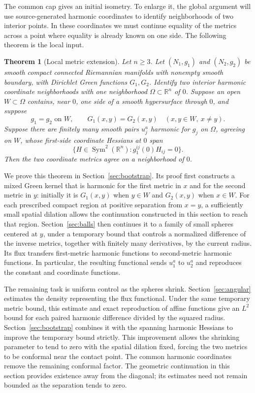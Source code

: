 \documentclass[11pt]{article}
\newtheorem{theorem}{Theorem}[section]
\theoremstyle{definition}
\theoremstyle{remark}
\numberwithin{equation}{section}
\begin{document}
The common cap gives an initial isometry. To enlarge it, the global
argument will use source-generated harmonic coordinates to identify
neighborhoods of two interior points. In these coordinates we must
continue equality of the metrics across a point where equality is
already known on one side. The following theorem is the local input.

\begin{theorem}[Local metric extension]\label{local:extension}
Let $n\geq3$.  Let $(N_1,g_1)$ and $(N_2,g_2)$ be smooth compact
connected Riemannian manifolds with nonempty smooth boundary, with
Dirichlet Green functions $G_1,G_2$.  Identify two interior harmonic
coordinate neighborhoods with one neighborhood $\Omega\subset
\mathbb R^n$ of $0$.  Suppose an open $W\subset\Omega$ contains, near
$0$, one side of a smooth hypersurface through $0$, and suppose
\[
 g_1=g_2\text{ on }W,\qquad
 G_1(x,y)=G_2(x,y)\quad(x,y\in W,\ x\ne y).
\]
Suppose there are finitely many smooth pairs $u_j^a$ harmonic for
$g_j$ on $\Omega$, agreeing on $W$, whose first-side coordinate
Hessians at $0$ span
\[
 \{H\in\operatorname{Sym}^2(\mathbb R^n):g_1^{ij}(0)H_{ij}=0\}.
\]
Then the two coordinate metrics agree on a neighborhood of $0$.
\end{theorem}

We prove this theorem in Section~\ref{sec:bootstrap}. Its proof first
constructs a mixed Green kernel that is harmonic for the first metric in
$x$ and for the second metric in $y$: initially it is $G_1(x,y)$
when $y\in W$ and $G_2(x,y)$ when $x\in W$. For each prescribed
compact region at positive separation from $x=y$, a sufficiently small
spatial dilation allows the continuation constructed in this section to
reach that region. Section~\ref{sec:balls} then continues it to a family
of small spheres centered at $y$, under a temporary bound that controls
a normalized difference of the inverse metrics, together with finitely
many derivatives, by the current radius. Its flux transfers
first-metric harmonic functions to second-metric harmonic functions.
In particular, the resulting functional sends $u_1^a$ to $u_2^a$ and
reproduces the constant and coordinate functions.

The remaining task is uniform control as the spheres shrink.
Section~\ref{sec:angular} estimates the density representing the flux
functional. Under the same temporary metric bound, this estimate and exact
reproduction of affine functions give an $L^2$ bound for each paired
harmonic difference divided by the squared radius.
Section~\ref{sec:bootstrap} combines it with the spanning harmonic
Hessians to improve the temporary bound strictly. This improvement
allows the shrinking parameter to tend to zero with the spatial dilation
fixed, forcing the two metrics to be conformal near the contact point.
The common harmonic coordinates remove the remaining conformal factor. The geometric
continuation in this section provides existence away from the diagonal;
its estimates need not remain bounded as the separation tends to zero.
\end{document}
